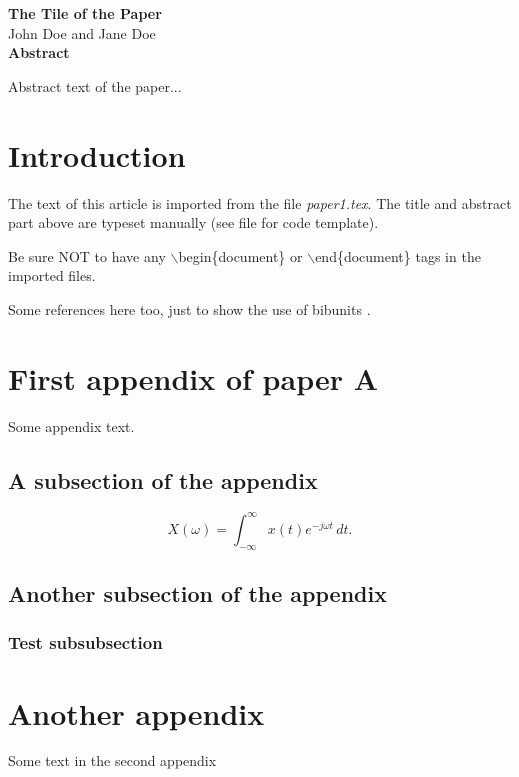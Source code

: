 \begin{bibunit}
\thispagestyle{plain}
\begin{center}
\Large\textbf{The Tile of the Paper}\\
\vspace{10mm}
\normalsize John Doe and Jane Doe\\
\vspace{15mm}
\textbf{Abstract}\\
\end{center}
Abstract text of the paper...

\section{Introduction}
The text of this article is imported from the file
\textit{paper1.tex}. The title and abstract part above are typeset
manually (see file for code template).

Be sure NOT to have any $\backslash$begin\{document\} or
$\backslash$end\{document\} tags in the imported files.

Some references here too, just to show the use of bibunits
\nocite{*}.

\paperappendix
\section{First appendix of paper A}
Some appendix text.
\subsection{A subsection of the appendix}
%
\begin{equation}
    X(\omega) = \int_{-\infty}^{\infty} x(t)e^{-j\omega t}\,dt.
\end{equation}
%
\subsection{Another subsection of the appendix}
\subsubsection{Test subsubsection}

\section{Another appendix}
Some text in the second appendix

\putbib
\end{bibunit}
